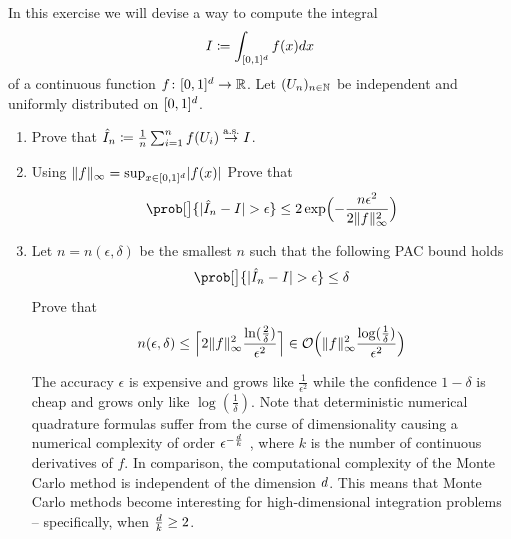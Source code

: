 
\begin{exercise}[subtitle={Monte Carlo \Coffeecup}]
    \label{ex: monte carlo}
    In this exercise we will devise a way to compute the integral
    \[
        I \coloneq \int_{[0,1]^\dims} f(x) dx
    \]
    of a continuous function \(f\colon [0,1]^\dims \to \real\).  Let
    \((U_n)_{n\in \nat}\) be independent and uniformly distributed on
    \([0,1]^\dims\).
    \begin{enumerate}[label=(\alph*), noitemsep]
        \item\label{it: (monte carlo) convergence}
        Prove that \(\hat I_n \coloneq \frac1n\sum_{i=1}^n f(U_i) \overset\as\to I\).

        \item\label{it: (monte carlo) PAC bound}
        Using \(\norm{f}_\infty = \sup_{x\in [0,1]^\dims} \abs{f(x)}\) Prove that
        \[
            \prob[\big]{\abs{\hat I_n - I} > \epsilon} \le 2\exp\Bigl(-\frac{n \epsilon^2}{2\norm{f}_\infty^2}\Bigr)
        \]

        \item\label{it: (monte carlo) sample complexity}
        Let \(n = n(\epsilon, \delta)\) be the smallest \(n\) such that the following
        PAC bound holds
        \[
            \prob[\big]{\abs{\hat I_n - I} > \epsilon} \le \delta
        \]
        Prove that
        \[
            n(\epsilon, \delta)
            \le \ceil[\Big]{2\norm{f}_\infty^2\frac{\ln(\tfrac2\delta)}{\epsilon^2}}
            \in \bigO\Bigl(\norm{f}_\infty^2\frac{\log(\frac1\delta)}{\epsilon^2}\Bigr)
        \]
        \begin{remark}
            \label{rem: accuracy vs confidence}
            The accuracy \(\epsilon\) is expensive and grows like
            \(\frac1{\epsilon^2}\) while the confidence \(1-\delta\) is cheap and grows only
            like \(\log(\frac1\delta)\). Note that deterministic numerical quadrature
            formulas suffer from the curse of dimensionality causing a numerical
            complexity of order \(\epsilon^{-\frac{\dims}k}\) \citep[Sec.~1.3.12, Prop.~1]{novakDeterministicStochasticError1988}, where \(k\) is the
            number of continuous derivatives of \(f\). In comparison, the 
            computational complexity of the Monte Carlo method is independent of
            the dimension \(\dims\). This means that Monte Carlo methods become
            interesting for high-dimensional integration problems -- specifically,
            when \(\frac{\dims}k \ge 2\).
        \end{remark}
    \end{enumerate}
\end{exercise}

